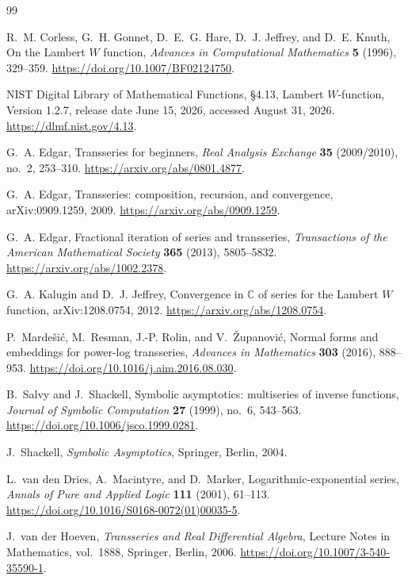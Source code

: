 \documentclass[11pt,oneside]{book}
\theoremstyle{definition}
\theoremstyle{remark}
\begin{document}
\begin{thebibliography}{99}

R.~M. Corless, G.~H. Gonnet, D.~E.~G. Hare, D.~J. Jeffrey, and
D.~E. Knuth,
\newblock On the Lambert \(W\) function,
\newblock \emph{Advances in Computational Mathematics} \textbf{5} (1996),
329--359.
\newblock \url{https://doi.org/10.1007/BF02124750}.

NIST Digital Library of Mathematical Functions,
\newblock \S4.13, Lambert \(W\)-function,
\newblock Version 1.2.7, release date June 15, 2026,
accessed August 31, 2026.
\newblock \url{https://dlmf.nist.gov/4.13}.

G.~A. Edgar,
\newblock Transseries for beginners,
\newblock \emph{Real Analysis Exchange} \textbf{35} (2009/2010), no.~2,
253--310.
\newblock \url{https://arxiv.org/abs/0801.4877}.

G.~A. Edgar,
\newblock Transseries: composition, recursion, and convergence,
\newblock arXiv:0909.1259, 2009.
\newblock \url{https://arxiv.org/abs/0909.1259}.

G.~A. Edgar,
\newblock Fractional iteration of series and transseries,
\newblock \emph{Transactions of the American Mathematical Society}
\textbf{365} (2013), 5805--5832.
\newblock \url{https://arxiv.org/abs/1002.2378}.


G.~A. Kalugin and D.~J. Jeffrey,
\newblock Convergence in $\mathbb{C}$ of series for the Lambert $W$ function,
\newblock arXiv:1208.0754, 2012.
\newblock \url{https://arxiv.org/abs/1208.0754}.

P.~Marde\v{s}i\'c, M.~Resman, J.-P. Rolin, and V.~\v{Z}upanovi\'c,
\newblock Normal forms and embeddings for power-log transseries,
\newblock \emph{Advances in Mathematics} \textbf{303} (2016), 888--953.
\newblock \url{https://doi.org/10.1016/j.aim.2016.08.030}.

B.~Salvy and J.~Shackell,
\newblock Symbolic asymptotics: multiseries of inverse functions,
\newblock \emph{Journal of Symbolic Computation} \textbf{27} (1999),
no.~6, 543--563.
\newblock \url{https://doi.org/10.1006/jsco.1999.0281}.

J.~Shackell,
\newblock \emph{Symbolic Asymptotics},
\newblock Springer, Berlin, 2004.

L.~van den Dries, A.~Macintyre, and D.~Marker,
\newblock Logarithmic-exponential series,
\newblock \emph{Annals of Pure and Applied Logic} \textbf{111} (2001),
61--113.
\newblock \url{https://doi.org/10.1016/S0168-0072(01)00035-5}.

J.~van der Hoeven,
\newblock \emph{Transseries and Real Differential Algebra},
\newblock Lecture Notes in Mathematics, vol.~1888,
Springer, Berlin, 2006.
\newblock \url{https://doi.org/10.1007/3-540-35590-1}.

\end{thebibliography}
\end{document}
